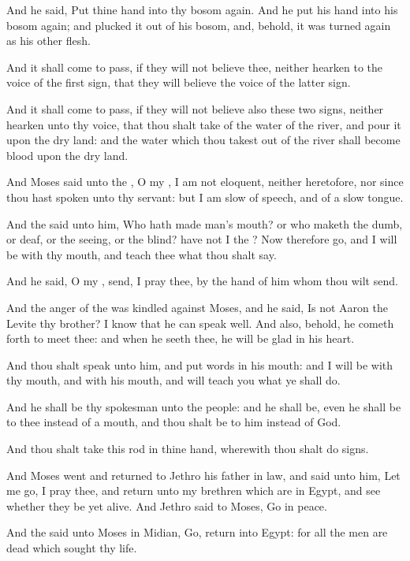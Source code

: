 \Verse And he said, Put thine hand into thy bosom again. And he put his hand into his bosom again; and plucked it out of his bosom, and, behold, it was turned again as his other flesh.

\Verse And it shall come to pass, if they will not believe thee, neither hearken to the voice of the first sign, that they will believe the voice of the latter sign.

\Verse And it shall come to pass, if they will not believe also these two signs, neither hearken unto thy voice, that thou shalt take of the water of the river, and pour it upon the dry land: and the water which thou takest out of the river shall become blood upon the dry land.

\Verse And Moses said unto the \LORD, O my \LORD, I am not eloquent, neither heretofore, nor since thou hast spoken unto thy servant: but I am slow of speech, and of a slow tongue.

\Verse And the \LORD said unto him, Who hath made man's mouth? or who maketh the dumb, or deaf, or the seeing, or the blind? have not I the \LORD?  \Verse Now therefore go, and I will be with thy mouth, and teach thee what thou shalt say.

\Verse And he said, O my \LORD, send, I pray thee, by the hand of him whom thou wilt send.

\Verse And the anger of the \LORD was kindled against Moses, and he said, Is not Aaron the Levite thy brother? I know that he can speak well.  And also, behold, he cometh forth to meet thee: and when he seeth thee, he will be glad in his heart.

\Verse And thou shalt speak unto him, and put words in his mouth: and I will be with thy mouth, and with his mouth, and will teach you what ye shall do.

\Verse And he shall be thy spokesman unto the people: and he shall be, even he shall be to thee instead of a mouth, and thou shalt be to him instead of God.

\Verse And thou shalt take this rod in thine hand, wherewith thou shalt do signs.

\Verse And Moses went and returned to Jethro his father in law, and said unto him, Let me go, I pray thee, and return unto my brethren which are in Egypt, and see whether they be yet alive. And Jethro said to Moses, Go in peace.

\Verse And the \LORD said unto Moses in Midian, Go, return into Egypt: for all the men are dead which sought thy life.

